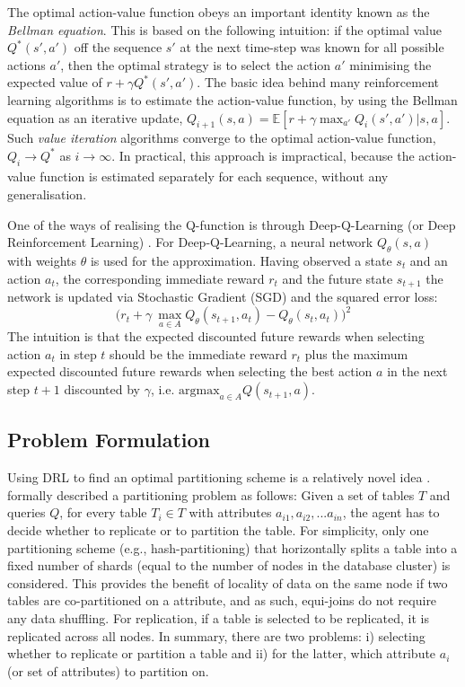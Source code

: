 The optimal action-value function obeys an important identity known as the \textit{Bellman equation}. This is based on the following intuition: if the optimal value $Q^*(s',a')$ off the sequence $s'$ at the next time-step was known for all possible actions $a'$, then the optimal strategy is to select the action $a'$ minimising the expected value of $r + \gamma Q^*(s',a')$.
The basic idea behind many reinforcement learning algorithms is to estimate the action-value function, by using the Bellman equation as an iterative update, $Q_{i+1}(s,a) = \mathbb{E}[r+\gamma \max_{a'}Q_i(s',a')| s,a]$. Such \textit{value iteration} algorithms converge to the optimal action-value function, $Q_i \xrightarrow[]{} Q^*$ as $i \xrightarrow[]{} \infty$\cite{sutton2018reinforcement}. In practical, this approach is impractical, because the action-value function is estimated separately for each sequence, without any generalisation. 

One of the ways of realising the Q-function is through Deep-Q-Learning (or Deep Reinforcement Learning) \cite{Zhu:2017:BTP:3127479.3128605}.  For Deep-Q-Learning, a neural network $Q_\theta(s,a)$ with weights $\theta$ is used for the approximation. Having observed a state $s_t$ and an action $a_t$, the corresponding immediate reward $r_t$ and the future state $s_{t+1}$ the network is updated via Stochastic Gradient (SGD) and the squared error loss:
\begin{equation}
    \bigg( r_t + \gamma\ \max_{a \in A} Q_\theta(s_{t+1},a_t) - Q_\theta(s_t, a_t) \bigg)^2
\end{equation}
The intuition is that the expected discounted future rewards when selecting action $a_t$ in step $t$ should be the immediate reward $r_t$ plus the maximum expected discounted future rewards when selecting the best action $a$ in the next step $t+1$ discounted by $\gamma$, i.e. $\text{argmax}_{a \in A} Q(s_{t+1},a)$.

\subsection{Problem Formulation}
Using DRL to find an optimal partitioning scheme is a relatively novel idea \cite{Hilprecht:2019:TLP:3329859.3329876, DBLP:conf/sigmod/DurandPPMBSSRB18}. \citeauthor{Hilprecht:2019:TLP:3329859.3329876} formally described a partitioning problem as follows: Given a set of tables $T$ and queries $Q$, for every table $T_i \in T$ with attributes $a_{i1}, a_{i2}, ...a_{in}$, the agent has to decide whether to replicate or to partition the table. For simplicity, only one partitioning scheme (e.g., hash-partitioning) that horizontally splits a table into a fixed number of shards (equal to the number of nodes in the database cluster) is considered. This provides the benefit of locality of data on the same node if two tables are co-partitioned on a attribute, and as such, equi-joins do not require any data shuffling. For replication, if a table is selected to be replicated, it is replicated across all nodes. In summary, there are two problems: i) selecting whether to replicate or partition a table and ii) for the latter, which attribute $a_i$ (or set of attributes) to partition on. 

